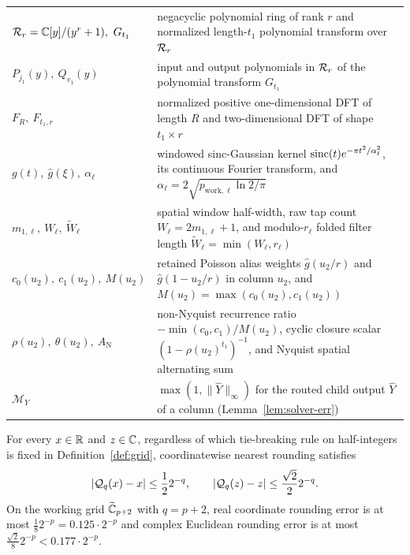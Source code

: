 \begin{table}[!ht]
\begin{tabular}{@{}>{\raggedright}p{}>{\raggedright\arraybackslash}p{}@{}}
$\mathcal{R}_r = \mathbb{C}[y]/(y^r + 1),\ G_{t_1}$ & negacyclic polynomial ring of rank $r$ and normalized length-$t_1$ polynomial transform over $\mathcal{R}_r$ \\
$P_{j_1}(y),\ Q_{v_1}(y)$ & input and output polynomials in $\mathcal{R}_r$ of the polynomial transform $G_{t_1}$ \\
$F_R,\ F_{t_1, r}$ & normalized positive one-dimensional DFT of length $R$ and two-dimensional DFT of shape $t_1 \times r$ \\
$g(t),\ \hat{g}(\xi),\ \alpha_\ell$ & windowed sinc-Gaussian kernel $\operatorname{sinc}(t)e^{-\pi t^2 / \alpha_\ell^2}$, its continuous Fourier transform, and $\alpha_\ell = 2\sqrt{p_{\mathrm{work},\ell}\ln 2 / \pi}$ \\
$m_{1,\ell},\ W_\ell,\ \tilde{W}_\ell$ & spatial window half-width, raw tap count $W_\ell = 2m_{1,\ell} + 1$, and modulo-$r_\ell$ folded filter length $\tilde{W}_\ell = \min(W_\ell, r_\ell)$ \\
$c_0(u_2),\ c_1(u_2),\ M(u_2)$ & retained Poisson alias weights $\hat{g}(u_2/r)$ and $\hat{g}(1 - u_2/r)$ in column $u_2$, and $M(u_2) = \max(c_0(u_2), c_1(u_2))$ \\
$\rho(u_2),\ \theta(u_2),\ A_{\mathrm{N}}$ & non-Nyquist recurrence ratio $-\min(c_0, c_1)/M(u_2)$, cyclic closure scalar $(1 - \rho(u_2)^{t_1})^{-1}$, and Nyquist spatial alternating sum \\
$\mathcal{M}_Y$ & $\max(1, \|\widehat{Y}\|_\infty)$ for the routed child output $\widehat{Y}$ of a column (Lemma~\ref{lem:solver-err}) \\
\bottomrule
\end{tabular}
\end{table}

For every $x \in \mathbb{R}$ and $z \in \mathbb{C}$, regardless of which tie-breaking rule on half-integers is fixed in Definition~\ref{def:grid}, coordinatewise nearest rounding satisfies
\begin{equation}\label{eq:quant-err}
  |\mathcal{Q}_q(x) - x| \le \frac{1}{2} 2^{-q}, \qquad |\mathcal{Q}_q(z) - z| \le \frac{\sqrt{2}}{2} 2^{-q}.
\end{equation}
On the working grid $\widetilde{\mathbb{C}}_{p+2}$ with $q = p + 2$, real coordinate rounding error is at most $\frac{1}{8} 2^{-p} = 0.125 \cdot 2^{-p}$ and complex Euclidean rounding error is at most $\frac{\sqrt{2}}{8} 2^{-p} < 0.177 \cdot 2^{-p}$.

